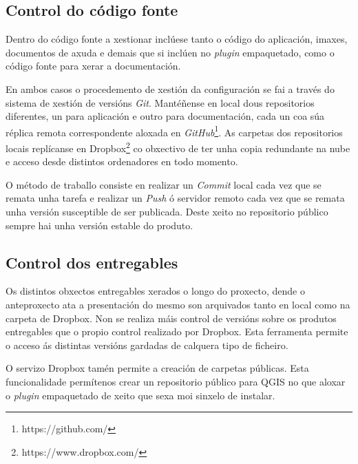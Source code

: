 \subsection{Control do código fonte}
Dentro do código fonte a xestionar inclúese tanto o código do aplicación, imaxes, documentos de axuda e demais que si inclúen no \emph{plugin} empaquetado, como o código fonte para xerar a documentación.

En ambos casos o procedemento de xestión da configuración se fai a través do sistema de xestión de versións \emph{Git}. Mantéñense en local dous repositorios diferentes, un para aplicación e outro para documentación, cada un coa súa réplica remota correspondente aloxada en \emph{GitHub}\footnote{https://github.com/}. As carpetas dos repositorios locais replícanse en Dropbox\footnote{https://www.dropbox.com/} co obxectivo de ter unha copia redundante na nube e acceso desde distintos ordenadores en todo momento.

O método de traballo consiste en realizar un \emph{Commit} local cada vez que se remata unha tarefa e realizar un \emph{Push} ó servidor remoto cada vez que se remata unha versión susceptible de ser publicada. Deste xeito no repositorio público sempre hai unha versión estable do produto.

\subsection{Control dos entregables}
Os distintos obxectos entregables xerados o longo do proxecto, dende o anteproxecto ata a presentación do mesmo son arquivados tanto en local como na carpeta de Dropbox. Non se realiza máis control de versións sobre os produtos entregables que o propio control realizado por Dropbox. Esta ferramenta permite o acceso ás distintas versións gardadas de calquera tipo de ficheiro.

O servizo Dropbox tamén permite a creación de carpetas públicas. Esta funcionalidade permítenos crear un repositorio público para QGIS no que aloxar o \emph{plugin} empaquetado de xeito que sexa moi sinxelo de instalar.